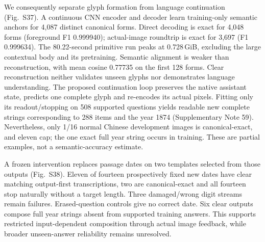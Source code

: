 We consequently separate glyph formation from language continuation
(Fig.~S37). A continuous CNN encoder and decoder learn training-only semantic
anchors for 4,087 distinct canonical forms. Direct decoding is exact for
4,048 forms (foreground F1 0.999940); actual-image roundtrip is exact for
3,697 (F1 0.999634). The 80.22-second primitive run peaks at 0.728\,GiB,
excluding the large contextual body and its pretraining. Semantic alignment
is weaker than reconstruction, with mean cosine 0.77735 on the first 128
forms. Clear reconstruction neither validates unseen glyphs nor demonstrates
language understanding. The proposed continuation loop preserves the native
assistant state, predicts one complete glyph and re-encodes its actual pixels.
Fitting only its readout/stopping on 508 supported questions yields readable
new complete strings corresponding to 288 items and the year 1874
(Supplementary Note 59). Nevertheless, only 1/16 normal Chinese development
images is canonical-exact, and eleven cap; the one exact full year string
occurs in training. These are partial examples, not a semantic-accuracy estimate.

A frozen intervention replaces passage dates on two templates selected from
those outputs (Fig.~S38). Eleven of fourteen prospectively fixed new dates
have clear matching output-first transcriptions, two are canonical-exact and
all fourteen stop naturally without a target length. Three damaged/wrong
digit streams remain failures. Erased-question controls give no correct date.
Six clear outputs compose full year strings absent from supported training
answers. This supports restricted input-dependent composition through actual
image feedback, while broader unseen-answer reliability remains unresolved.
